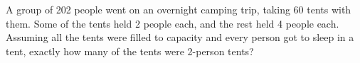 \question[1]
A group of 202 people went on an overnight camping trip, taking 60 tents with them. Some of the tents held 2 people each, and the rest held 4 people each. Assuming all the tents were filled to capacity and every person got to sleep in a tent, exactly how many of the tents were 2-person tents?
\begin{choices}
\end{choices}


